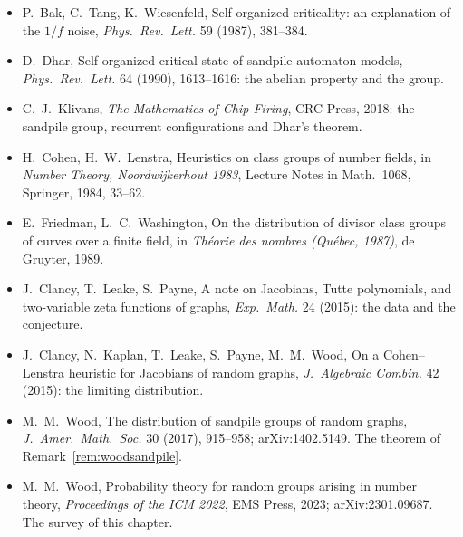 \begin{itemize}
\item P.~Bak, C.~Tang, K.~Wiesenfeld, Self-organized criticality: an explanation of the $1/f$ noise, \emph{Phys.\ Rev.\ Lett.} 59 (1987), 381--384.
\item D.~Dhar, Self-organized critical state of sandpile automaton models, \emph{Phys.\ Rev.\ Lett.} 64 (1990), 1613--1616: the abelian property and the group.
\item C.~J.~Klivans, \emph{The Mathematics of Chip-Firing}, CRC Press, 2018: the sandpile group, recurrent configurations and Dhar's theorem.
\item H.~Cohen, H.~W.~Lenstra, Heuristics on class groups of number fields, in \emph{Number Theory, Noordwijkerhout 1983}, Lecture Notes in Math.\ 1068, Springer, 1984, 33--62.
\item E.~Friedman, L.~C.~Washington, On the distribution of divisor class groups of curves over a finite field, in \emph{Th\'eorie des nombres (Qu\'ebec, 1987)}, de Gruyter, 1989.
\item J.~Clancy, T.~Leake, S.~Payne, A note on Jacobians, Tutte polynomials, and two-variable zeta functions of graphs, \emph{Exp.\ Math.} 24 (2015): the data and the conjecture.
\item J.~Clancy, N.~Kaplan, T.~Leake, S.~Payne, M.~M.~Wood, On a Cohen--Lenstra heuristic for Jacobians of random graphs, \emph{J.\ Algebraic Combin.} 42 (2015): the limiting distribution.
\item M.~M.~Wood, The distribution of sandpile groups of random graphs, \emph{J.\ Amer.\ Math.\ Soc.} 30 (2017), 915--958; arXiv:1402.5149. The theorem of Remark~\ref{rem:woodsandpile}.
\item M.~M.~Wood, Probability theory for random groups arising in number theory, \emph{Proceedings of the ICM 2022}, EMS Press, 2023; arXiv:2301.09687. The survey of this chapter.
\end{itemize}
